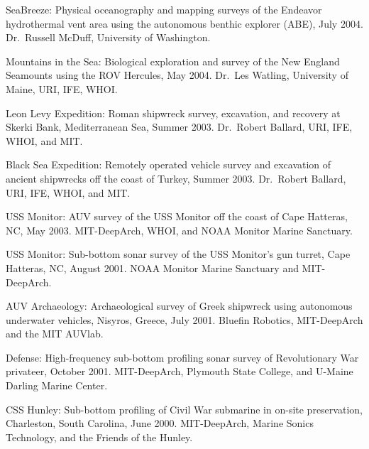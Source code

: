 \begin{cvenum}
  \item SeaBreeze: Physical oceanography and mapping surveys of the Endeavor hydrothermal vent area using the autonomous benthic explorer (ABE), July 2004. Dr.\ Russell McDuff, University of Washington.
  \item Mountains in the Sea: Biological exploration and survey of the New England Seamounts using the ROV Hercules, May 2004. Dr.\ Les Watling, University of Maine, URI, IFE, WHOI.
  \item Leon Levy Expedition: Roman shipwreck survey, excavation, and recovery at Skerki Bank, Mediterranean Sea, Summer 2003. Dr.\ Robert Ballard, URI, IFE, WHOI, and MIT.
  \item Black Sea Expedition: Remotely operated vehicle survey and excavation of ancient shipwrecks off the coast of Turkey, Summer 2003. Dr.\ Robert Ballard, URI, IFE, WHOI, and MIT.
  \item USS Monitor: AUV survey of the USS Monitor off the coast of Cape Hatteras, NC, May 2003. MIT-DeepArch, WHOI, and NOAA Monitor Marine Sanctuary.
  \item USS Monitor: Sub-bottom sonar survey of the USS Monitor's gun turret, Cape Hatteras, NC, August 2001. NOAA Monitor Marine Sanctuary and MIT-DeepArch.
  \item AUV Archaeology: Archaeological survey of Greek shipwreck using autonomous underwater vehicles, Nisyros, Greece, July 2001. Bluefin Robotics, MIT-DeepArch and the MIT AUVlab.
  \item Defense: High-frequency sub-bottom profiling sonar survey of Revolutionary War privateer, October 2001. MIT-DeepArch, Plymouth State College, and U-Maine Darling Marine Center.
  \item CSS Hunley: Sub-bottom profiling of Civil War submarine in on-site preservation, Charleston, South Carolina, June 2000. MIT-DeepArch, Marine Sonics Technology, and the Friends of the Hunley.
\end{cvenum}
